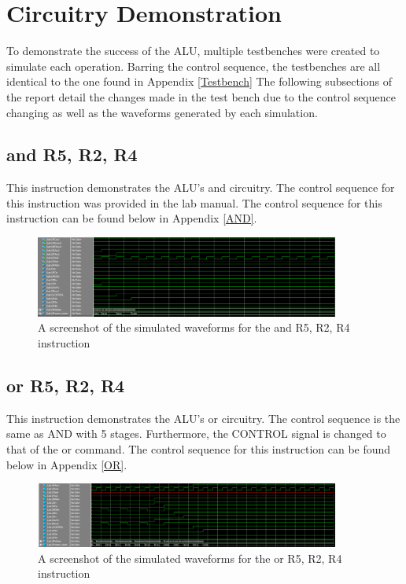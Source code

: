 \documentclass{article}
\begin{document}
\section{Circuitry Demonstration}

    To demonstrate the success of the ALU, multiple testbenches were created to simulate each operation. Barring the control sequence, the testbenches are all identical to the one found in Appendix \ref{Testbench} The following subsections of the report detail the changes made in the test bench due to the control sequence changing as well as the waveforms generated by each simulation.

    \subsection{and R5, R2, R4}
    This instruction demonstrates the ALU's and circuitry. The control sequence for this instruction was provided in the lab manual. The control sequence for this instruction can be found below in Appendix \ref{AND}.
    
    \begin{figure}[h!]
        \begin{center}
            \includegraphics[width=10cm]{and}
            \caption{A screenshot of the simulated waveforms for the and R5, R2, R4 instruction}
        \end{center}
    \end{figure}

    \subsection{or R5, R2, R4}
     This instruction demonstrates the ALU's or circuitry. The control sequence is the same as AND with 5 stages. Furthermore, the CONTROL signal is changed to that of the or command. The control sequence for this instruction can be found below in Appendix \ref{OR}.
     
    \begin{figure}[h!]
        \begin{center}
            \includegraphics[width=10cm]{or}
            \caption{A screenshot of the simulated waveforms for the or R5, R2, R4 instruction}
        \end{center}
    \end{figure}
     
\end{document}
